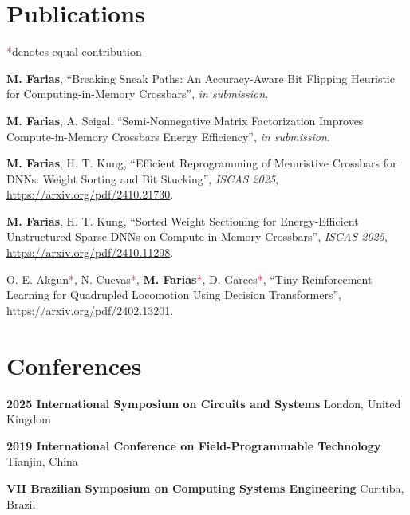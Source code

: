 \documentclass[letterpaper,10pt]{article}
\newcommand{\co}{\textcolor{crimson}{*}}
\begin{document}
\section{Publications}
\co denotes equal contribution
\vspace*{.1cm}
\begin{etaremune}
	\renewcommand{\labelenumi}{[\theenumi]}
    \item \textbf{M. Farias}, ``Breaking Sneak Paths: An Accuracy-Aware Bit Flipping Heuristic for Computing-in-Memory Crossbars'', \textit{in submission}.
	\item \textbf{M. Farias}, A. Seigal, ``Semi-Nonnegative Matrix Factorization Improves Compute-in-Memory Crossbars Energy Efficiency'', \textit{in submission}.
	\item \textbf{M. Farias}, H. T. Kung, ``Efficient Reprogramming of Memristive Crossbars for DNNs: Weight Sorting and Bit Stucking'', \textit{ISCAS 2025}, \href{https://arxiv.org/pdf/2410.21730}{https://arxiv.org/pdf/2410.21730}.
    \item \textbf{M. Farias}, H. T. Kung, ``Sorted Weight Sectioning for Energy-Efficient Unstructured Sparse DNNs on Compute-in-Memory Crossbars'', \textit{ISCAS 2025}, \href{https://arxiv.org/pdf/2410.11298}{https://arxiv.org/pdf/2410.11298}.
	\item O. E. Akgun\co, N. Cuevas\co, \textbf{M. Farias}\co, D. Garces\co, ``Tiny Reinforcement Learning for Quadrupled Locomotion Using Decision Transformers'', \href{https://arxiv.org/pdf/2402.13201}{https://arxiv.org/pdf/2402.13201}.
\end{etaremune}
\vspace*{-.25cm}

\section{Conferences}
\vspace*{.1cm}
\begin{etaremune}
	\item \textbf{2025 International Symposium on Circuits and Systems}
	\hfill{London, United Kingdom}
	\item \textbf{2019 International Conference on Field-Programmable Technology}
	\hfill{Tianjin, China}
	\item \textbf{VII Brazilian Symposium on Computing Systems Engineering}
	\hfill{Curitiba, Brazil}
	\end{etaremune}
\end{document}
